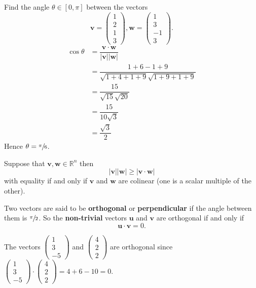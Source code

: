 \begin{example}
    Find the angle $\theta\in[0,\pi]$ between the vectors
    \[
        \bm v=
        \begin{pmatrix}
            1\\2\\1\\3
        \end{pmatrix}
        ,\bm w=
        \begin{pmatrix}
            1\\3\\-1\\3
        \end{pmatrix}.
    \]
    \begin{align*}
        \cos\theta&=\dfrac{\bm v\cdot\bm w}{|\bm v||\bm w|}\\
        &=\dfrac{1+6-1+9}{\sqrt{1+4+1+9}\sqrt{1+9+1+9}}\\
        &=\dfrac{15}{\sqrt{15}\sqrt{20}}\\
        &=\dfrac{15}{10\sqrt{3}}\\
        &=\dfrac{\sqrt 3}2
    \end{align*}
    Hence $\theta=\sfrac\pi6$.
\end{example}

\begin{theorem}
    Suppose that $\bm v,\bm w\in\mathbb R^n$ then
    \[|\bm v||\bm w|\geq|\bm v\cdot\bm w|\]
    with equality if and only if $\bm v$ and $\bm w$ are colinear (one is a scalar multiple of the other).
\end{theorem}

Two vectors are said to be \textbf{orthogonal} or \textbf{perpendicular} if the angle between them is $\sfrac\pi2$. So the \textbf{non-trivial} vectors $\bm u$ and $\bm v$ are orthogonal if and only if
\[\bm u\cdot\bm v=0.\]

\begin{example}
    The vectors
    $
        \begin{pmatrix}
            1\\3\\-5
        \end{pmatrix}
    $
    and
    $
        \begin{pmatrix}
            4\\2\\2
        \end{pmatrix}
    $
    are orthogonal since
    $
        \begin{pmatrix}
            1\\3\\-5
        \end{pmatrix}
        \cdot
        \begin{pmatrix}
            4\\2\\2
        \end{pmatrix}
        =4+6-10=0
    $.
\end{example}


